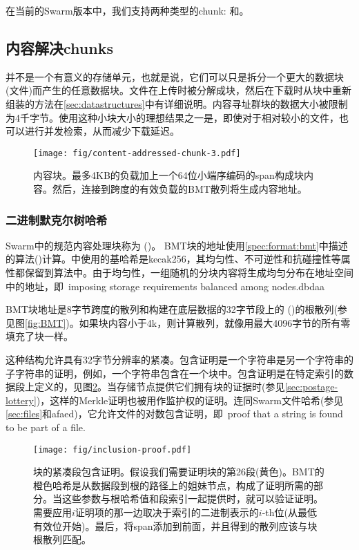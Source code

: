 在当前的Swarm版本中，我们支持两种类型的chunk: 和。 

\subsection{内容解决chunks\statusgreen}\label{sec:content-addressed-chunks}

并不是一个有意义的存储单元，也就是说，它们可以只是拆分一个更大的数据块(文件)而产生的任意数据块。文件在上传时被分解成块，然后在下载时从块中重新组装的方法在\ref{sec:datastructures}中有详细说明。内容寻址群块的数据大小被限制为4千字节。使用这种小块大小的理想结果之一是，即使对于相对较小的文件，也可以进行并发检索，从而减少下载延迟。 

\begin{figure}[htbp]
   \centering
   \texttt{[image: fig/content-addressed-chunk-3.pdf]}
   \caption[内容解决chunk\statusgreen]{内容块。最多4KB的负载加上一个64位小端序编码的span构成块内容。然后，连接到跨度的有效负载的BMT散列将生成内容地址。}
   \label{fig:content-addressed-chunk}
\end{figure}

\subsubsection{二进制默克尔树哈希}

Swarm中的规范内容处理块称为 ()。
BMT块的地址使用\ref{spec:format:bmt}中描述的算法()计算。中使用的基哈希是kecak256，其均匀性、不可逆性和抗碰撞性等属性都保留到算法中。由于均匀性，一组随机的分块内容将生成均匀分布在地址空间中的地址，即\ imposing storage requirements balanced among nodes.dbdaa

BMT块地址是8字节跨度的散列和构建在底层数据的32字节段上的 ()的根散列(参见图\ref{fig:BMT})。如果块内容小于4k，则计算散列，就像用最大4096字节的所有零填充了块一样。

这种结构允许具有32字节分辨率的紧凑。包含证明是一个字符串是另一个字符串的子字符串的证明，例如，一个字符串包含在一个块中。包含证明是在特定索引的数据段上定义的，见图\ref{fig:chunk-inclusion}。当存储节点提供它们拥有块的证据时(参见\ref{sec:postage-lottery})，这样的Merkle证明也被用作监护权的证明。连同Swarm文件哈希(参见\ref{sec:files}和afaed)，它允许文件的对数包含证明，即\ proof that a string is found to be part of a file.\begin{figure}[htbp]
\centering
\texttt{[image: fig/inclusion-proof.pdf]}
\caption[块的紧凑段包含证明\statusgreen]{块的紧凑段包含证明。假设我们需要证明块的第26段(黄色)。BMT的橙色哈希是从数据段到根的路径上的姐妹节点，构成了证明所需的部分。当这些参数与根哈希值和段索引一起提供时，就可以验证证明。需要应用$i$证明项的那一边取决于索引的二进制表示的$i$-th位(从最低有效位开始)。最后，将span添加到前面，并且得到的散列应该与块根散列匹配。}
\label{fig:chunk-inclusion}
\end{figure}



